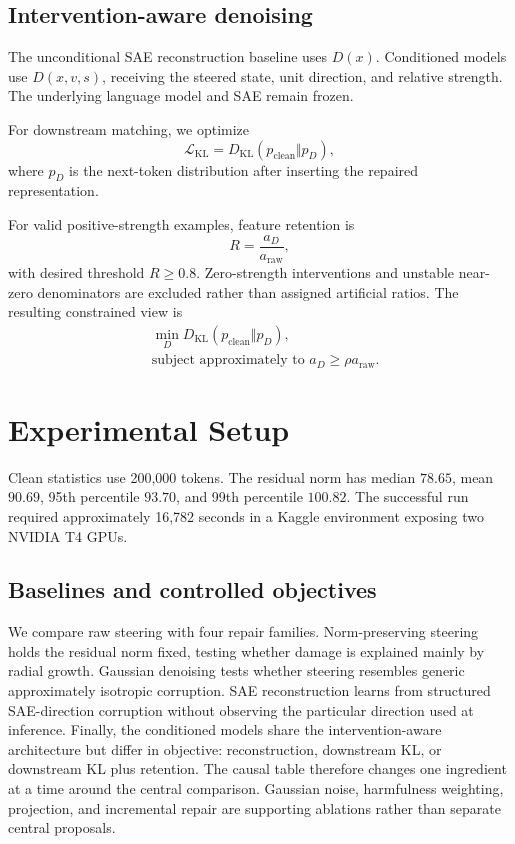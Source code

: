 \documentclass[11pt,twocolumn]{article}
\newcommand{\KL}{D_{\mathrm{KL}}}
\begin{document}
\subsection{Intervention-aware denoising}
The unconditional SAE reconstruction baseline uses $D(x)$. Conditioned models use $D(x,v,s)$, receiving the steered state, unit direction, and relative strength. The underlying language model and SAE remain frozen.

For downstream matching, we optimize
\begin{equation}
\mathcal L_{\mathrm{KL}}=
\KL\!\left(p_{\mathrm{clean}}\Vert p_D\right),
\end{equation}
where $p_D$ is the next-token distribution after inserting the repaired representation.

For valid positive-strength examples, feature retention is
\begin{equation}
  R=\frac{a_D}{a_{\mathrm{raw}}},
\end{equation}
with desired threshold $R\geq0.8$. Zero-strength interventions and unstable near-zero denominators are excluded rather than assigned artificial ratios. The resulting constrained view is
\begin{equation}
  \begin{aligned}
  &\min_D \KL(p_{\mathrm{clean}}\Vert p_D),\\[-2pt]
  &\text{subject approximately to }a_D\geq \rho a_{\mathrm{raw}}.
  \end{aligned}
\end{equation}

\section{Experimental Setup}
Clean statistics use 200,000 tokens. The residual norm has median $78.65$, mean $90.69$, 95th percentile $93.70$, and 99th percentile $100.82$. The successful run required approximately 16,782 seconds in a Kaggle environment exposing two NVIDIA T4 GPUs.

\subsection{Baselines and controlled objectives}
We compare raw steering with four repair families. Norm-preserving steering holds the residual norm fixed, testing whether damage is explained mainly by radial growth. Gaussian denoising tests whether steering resembles generic approximately isotropic corruption. SAE reconstruction learns from structured SAE-direction corruption without observing the particular direction used at inference. Finally, the conditioned models share the intervention-aware architecture but differ in objective: reconstruction, downstream KL, or downstream KL plus retention. The causal table therefore changes one ingredient at a time around the central comparison. Gaussian noise, harmfulness weighting, projection, and incremental repair are supporting ablations rather than separate central proposals.
\end{document}
